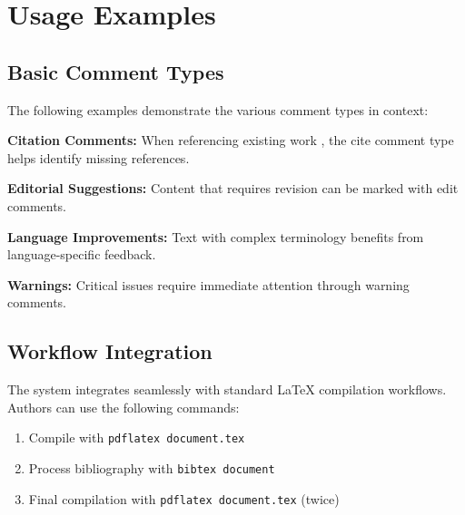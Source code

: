 \documentclass[magazine]{IEEEtran}
\begin{document}

\section{Usage Examples}

\subsection{Basic Comment Types}

The following examples demonstrate the various comment types in context:

\textbf{Citation Comments:} When referencing existing work , the cite comment type helps identify missing references.

\textbf{Editorial Suggestions:} Content that requires revision  can be marked with edit comments.

\textbf{Language Improvements:} Text with complex terminology  benefits from language-specific feedback.

\textbf{Warnings:} Critical issues  require immediate attention through warning comments.


\subsection{Workflow Integration}

The system integrates seamlessly with standard LaTeX compilation workflows. Authors can use the following commands:


\begin{enumerate}
\item Compile with \texttt{pdflatex document.tex}
\item Process bibliography with \texttt{bibtex document}
\item Final compilation with \texttt{pdflatex document.tex} (twice)
\end{enumerate}
\end{document}
